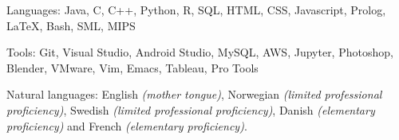 \documentclass[10pt,letterpaper]{article} %
\begin{document}

\inlineheadsection 
{Languages:}
{Java, C, C++, Python, R, SQL, HTML, CSS, Javascript, Prolog, {\LaTeX}, Bash, SML, MIPS}


\inlineheadsection 
{Tools:}
{Git, Visual Studio, Android Studio, MySQL, AWS, Jupyter, Photoshop, Blender, VMware, Vim, Emacs, Tableau, Pro Tools}


\inlineheadsection 
{Natural languages:}
{English \textit{(mother tongue)}, Norwegian \textit{(limited professional proficiency)}, Swedish \textit{(limited professional proficiency)}, Danish \textit{(elementary proficiency)} and French \textit{(elementary proficiency)}.}

\end{document}
